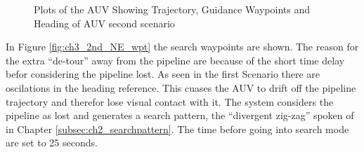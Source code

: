 		\begin{figure}[htbp]
			\caption{Plots of the AUV Showing Trajectory, Guidance Waypoints and Heading of AUV
			second scenario}
			\label{fig:ch3_2nd_NE_plots}
		\end{figure}
		In Figure \ref{fig:ch3_2nd_NE_wpt} the search waypoints are shown. The reason for the extra
		``de-tour'' away from the pipeline are because of the short time delay befor considering the
		pipeline lost. As seen in the first Scenario there are oscilations in the heading reference.
		This cuases the AUV to drift off the pipeline trajectory and therefor lose visual contact
		with it. The system considers the pipeline as lost and generates a search pattern, the
		``divergent zig-zag'' spoken of in Chapter \ref{subsec:ch2_searchpattern}. The time before
		going into search mode are set to 25 seconds.

